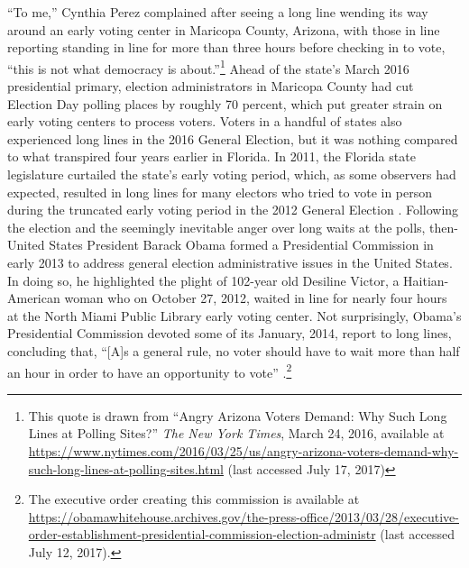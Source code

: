 \documentclass[12pt,titlepage]{article}
\begin{document}
``To me,'' Cynthia Perez complained after seeing a long line wending
its way around an early voting center in Maricopa County, Arizona,
with those in line reporting standing in line for more than three
hours before checking in to vote, ``this is not what democracy is
about.''\footnote{This quote is drawn from ``Angry Arizona Voters
  Demand: Why Such Long Lines at Polling Sites?'' \emph{The New York
    Times}, March 24, 2016, available at
  \url{https://www.nytimes.com/2016/03/25/us/angry-arizona-voters-demand-why-such-long-lines-at-polling-sites.html}
  (last accessed July 17, 2017)} Ahead of the state's March 2016
presidential primary, election administrators in Maricopa County had
cut Election Day polling places by roughly 70 percent, which put
greater strain on early voting centers to process voters. Voters in a
handful of states also experienced long lines in the 2016 General
Election, but it was nothing compared to what transpired four years
earlier in Florida.  In 2011, the Florida state legislature curtailed
the state's early voting period, which, as some observers had
expected, resulted in long lines for many electors who tried to vote
in person during the truncated early voting period in the 2012 General
Election \citep{herron_smith2014}.  Following the election and the
seemingly inevitable anger over long waits at the polls, then-United
States President Barack Obama formed a Presidential Commission in
early 2013 to address general election administrative issues in the
United States.  In doing so, he highlighted the plight of 102-year old
Desiline Victor, a Haitian-American woman who on October 27, 2012,
waited in line for nearly four hours at the North Miami Public Library
early voting center.  Not surprisingly, Obama's Presidential
Commission devoted some of its January, 2014, report to long lines,
concluding that, ``[A]s a general rule, no voter should have to wait
more than half an hour in order to have an opportunity to vote''
\citep[p.\ 13,][]{pcea:2014}.\footnote{The executive order creating
  this commission is available at
  \url{https://obamawhitehouse.archives.gov/the-press-office/2013/03/28/executive-order-establishment-presidential-commission-election-administr}
  (last accessed July 12, 2017).}
\end{document}
